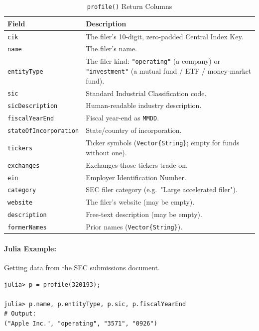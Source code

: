 \documentclass[11pt,a4paper]{report}
\begin{document}
\begin{table}[t]
\centering
\caption{\texttt{profile()} Return Columns}
\label{tab:profile}
\begin{tabular}{@{}p{}p{}@{}}
\toprule
\textbf{Field} & \textbf{Description} \\
\midrule
\texttt{cik}                  & The filer's 10-digit, zero-padded Central Index Key. \\
\texttt{name}                 & The filer's name. \\
\texttt{entityType}           & The filer kind: \texttt{"operating"} (a company) or \texttt{"investment"} (a mutual fund / ETF / money-market fund).\\
\texttt{sic}                  & Standard Industrial Classification code. \\
\texttt{sicDescription}       & Human-readable industry description. \\
\texttt{fiscalYearEnd}        & Fiscal year-end as \texttt{MMDD}. \\
\texttt{stateOfIncorporation} & State/country of incorporation. \\
\texttt{tickers}              & Ticker symbols (\texttt{Vector\{String\}}; empty for funds without one). \\
\texttt{exchanges}            & Exchanges those tickers trade on. \\
\texttt{ein}                  & Employer Identification Number. \\
\texttt{category}             & SEC filer category (e.g.\ "Large accelerated filer"). \\
\texttt{website}              & The filer's website (may be empty). \\
\texttt{description}          & Free-text description (may be empty). \\
\texttt{formerNames}          & Prior names (\texttt{Vector\{String\}}). \\
\bottomrule
\end{tabular}
\end{table}

\paragraph{Julia Example:} Getting data from the SEC submissions document.

\begin{lstlisting}
julia> p = profile(320193);

julia> p.name, p.entityType, p.sic, p.fiscalYearEnd
# Output:
("Apple Inc.", "operating", "3571", "0926")
\end{lstlisting}
\end{document}
